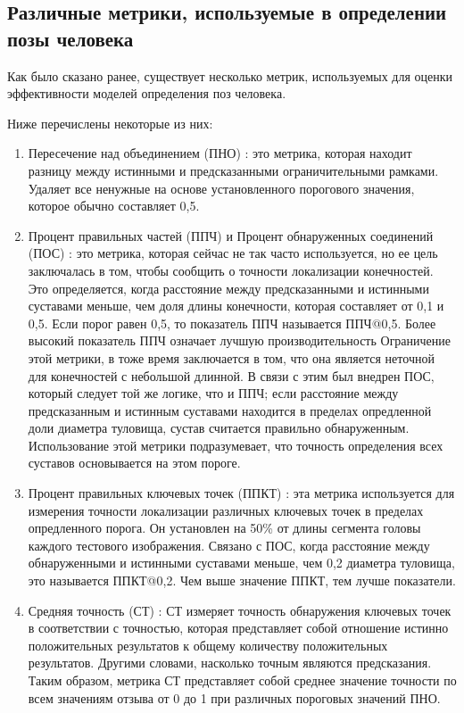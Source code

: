 \subsection{Различные метрики, используемые в определении позы человека}

Как было сказано ранее, существует несколько метрик, используемых для оценки эффективности моделей определения поз человека.

Ниже перечислены некоторые из них:

\begin{enumerate}[label=\arabic*)]
	
	\item Пересечение над объединением (ПНО) \cite{IoU}: это метрика, которая находит разницу между истинными и предсказанными ограничительными рамками.
	Удаляет все ненужные на основе установленного порогового значения, которое обычно составляет 0,5.
	
	\item Процент правильных частей (ППЧ) и Процент обнаруженных соединений (ПОС) \cite{PDJ}: это метрика, которая сейчас не так часто используется, но ее цель заключалась в том, чтобы сообщить о точности локализации конечностей.
	Это определяется, когда расстояние между предсказанными и истинными суставами меньше, чем доля длины конечности, которая составляет от 0,1 и 0,5.
	Если порог равен 0,5, то показатель ППЧ называется ППЧ@0,5.
	Более высокий показатель ППЧ означает лучшую производительность
	Ограничение этой метрики, в тоже время заключается в том, что она является неточной для конечностей с небольшой длинной.
	В связи с этим был внедрен ПОС, который следует той же логике, что и ППЧ; если расстояние между предсказанным и истинным суставами находится в пределах опредленной доли диаметра туловища, сустав считается правильно обнаруженным.
	Использование этой метрики подразумевает, что точность определения всех суставов основывается на этом пороге.
	
	\item Процент правильных ключевых точек  (ППКТ) \cite{guide-hpe}: эта метрика используется для измерения точности локализации различных ключевых точек в пределах опредленного порога.
	Он установлен на 50\% от длины сегмента головы каждого тестового изображения.
	Связано с ПОС, когда расстояние между обнаруженными и истинными суставами меньше, чем 0,2 диаметра туловища, это называется ППКТ@0,2.
	Чем выше значение ППКТ, тем лучше показатели.
	
	\item Средняя точность (СТ) \cite{guide-hpe}: СТ измеряет точность обнаружения ключевых точек в соответствии с точностью, которая представляет собой отношение истинно положительных результатов к общему количеству положительных результатов.
	Другими словами, насколько точным являются предсказания. 
	Таким образом, метрика СТ представляет собой среднее значение точности по всем значениям отзыва от 0 до 1 при различных пороговых значений ПНО.
	

\end{enumerate}

